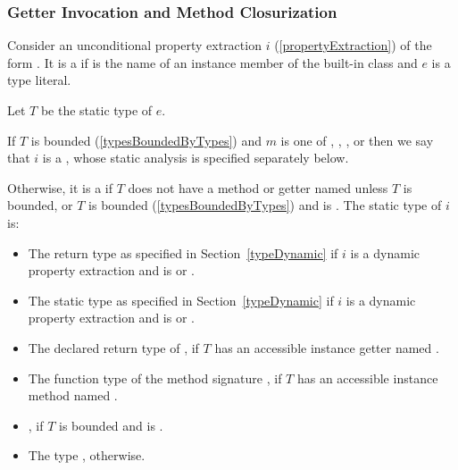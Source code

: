\documentclass[makeidx]{article}
\begin{document}
{\subsubsection{Getter Invocation and Method Closurization}

\LMHash{}%
Consider an unconditional property extraction $i$
(\ref{propertyExtraction})
of the form .
It is a  if \id{} is the name of
an instance member of the built-in class 
and $e$ is a type literal.



\LMHash{}%
Let $T$ be the static type of $e$.

\LMHash{}%
If $T$ is \DYNAMIC{} bounded
(\ref{typesBoundedByTypes})
and $m$ is one of
, , , or 
then we say that $i$ is a
,
whose static analysis is specified separately below.

\LMHash{}%
Otherwise, it is a  if $T$ does not have
a method or getter named \id{}
unless $T$ is \DYNAMIC{} bounded,
or $T$ is \FUNCTION{} bounded
(\ref{typesBoundedByTypes})
and \id{} is \CALL.
The static type of $i$ is:

\begin{itemize}
\item The return type as specified in Section~\ref{typeDynamic}
  if $i$ is a dynamic  property extraction
  and \id{} is  or .
\item The static type as specified in Section~\ref{typeDynamic}
  if $i$ is a dynamic  property extraction
  and \id{} is  or .
\item The declared return type of ,
  if $T$ has an accessible instance getter named \id.
\item The function type of the method signature ,
  if $T$ has an accessible instance method named \id.
\item \FUNCTION, if $T$ is \FUNCTION{} bounded and \id{} is \CALL.
\item The type \DYNAMIC, otherwise.
\end{itemize}

}
\end{document}
